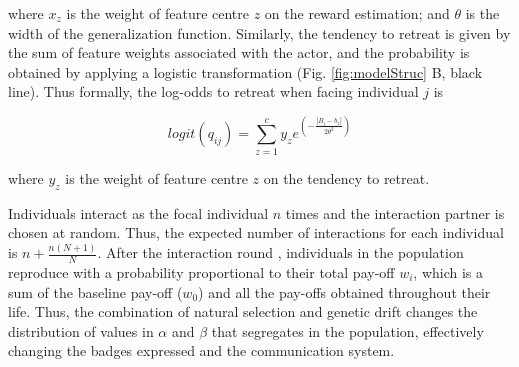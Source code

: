 \documentclass[
  12pt,
]{article}
\begin{document}
where \(x_z\) is the weight of feature centre \(z\) on the reward
estimation; and \(\theta\) is the width of the generalization function.
Similarly, the tendency to retreat is given by the sum of feature
weights associated with the actor, and the probability is obtained by
applying a logistic transformation (Fig. \ref{fig:modelStruc} B, black
line). Thus formally, the log-odds to retreat when facing individual
\(j\) is

\begin{equation}
logit(q_{ij}) =  \sum_{z=1}^{c} y_z e^{(-\frac{|B_i-b_z|}{2\theta^2})} 
\end{equation}

where \(y_z\) is the weight of feature centre \(z\) on the tendency to
retreat.

Individuals interact as the focal individual \(n\) times and the
interaction partner is chosen at random. Thus, the expected number of
interactions for each individual is \(n+\frac{n(N+1)}{N}\). After the
interaction round , individuals in the population reproduce with a
probability proportional to their total pay-off \(w_i\), which is a sum
of the baseline pay-off (\(w_0\)) and all the pay-offs obtained
throughout their life. Thus, the combination of natural selection and
genetic drift changes the distribution of values in \(\alpha\) and
\(\beta\) that segregates in the population, effectively changing the
badges expressed and the communication system.
\end{document}
